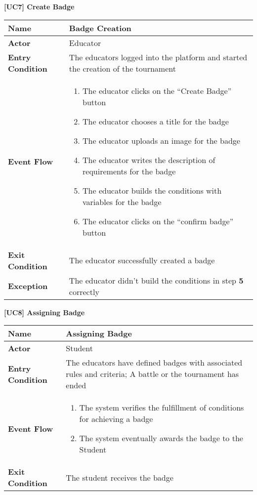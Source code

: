 \documentclass{article}
\begin{document}
\begin{table}
 \renewcommand{\arraystretch}{1.5}
    \centering
    \raggedright\textbf{[UC7] Create Badge}
    \begin{tabular}{|l|p{10cm}|}
        \hline
        \textbf{Name} & Badge Creation \\
        \hline
        \textbf{Actor} & Educator \\
        \hline
        \textbf{Entry Condition} & The educators logged into the platform and started the creation of the tournament  \\
        \hline
        \textbf{Event Flow} & 
        \begin{enumerate}[align=left, topsep=0pt, partopsep=0pt]
            \item The educator clicks on the “Create Badge” button
            \item The educator chooses a title for the badge
            \item The educator uploads an image for the badge
            \item The educator writes the description of requirements for the badge
            \item The educator builds the conditions with variables for the badge 
            \item The educator clicks on the “confirm badge” button
        \end{enumerate} \\
        \hline
        \textbf{Exit Condition} & The educator successfully created a badge \\
        \hline
        \textbf{Exception} & The educator didn't build the conditions in step \textbf{5} correctly  \\
        \hline
    \end{tabular}
\end{table}

\begin{table}
 \renewcommand{\arraystretch}{1.5}
    \centering
    \raggedright\textbf{[UC8] Assigning Badge}
    \begin{tabular}{|l|p{10cm}|}
        \hline
        \textbf{Name} & Assigning Badge \\
        \hline
        \textbf{Actor} & Student \\
        \hline
        \textbf{Entry Condition} & The educators have defined badges with associated rules and criteria; A battle or the tournament has ended\\
        \hline
        \textbf{Event Flow} & 
        \begin{enumerate}[align=left, topsep=0pt, partopsep=0pt]
            \item The system verifies the fulfillment of conditions for achieving a badge
            \item The system eventually awards the badge to the Student
        \end{enumerate} \\
        \hline
        \textbf{Exit Condition} & The student receives the badge \\
        \hline
    \end{tabular}
\end{table}
\end{document}

